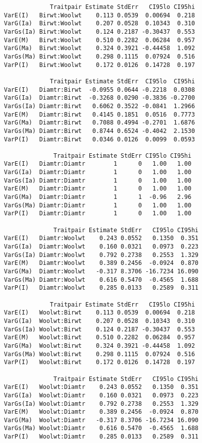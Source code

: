 \documentclass[titlepage]{article}  %
\begin{document}
\begin{verbatim}
             Traitpair Estimate StdErr   CI95lo CI95hi
VarE(I)   Birwt:Woolwt    0.113 0.0539  0.00694  0.218
VarG(Ia)  Birwt:Woolwt    0.207 0.0528  0.10343  0.310
VarGs(Ia) Birwt:Woolwt    0.124 0.2187 -0.30437  0.553
VarE(M)   Birwt:Woolwt    0.510 0.2282  0.06284  0.957
VarG(Ma)  Birwt:Woolwt    0.324 0.3921 -0.44458  1.092
VarGs(Ma) Birwt:Woolwt    0.298 0.1115  0.07924  0.516
VarP(I)   Birwt:Woolwt    0.172 0.0126  0.14728  0.197

             Traitpair Estimate StdErr  CI95lo  CI95hi
VarE(I)   Diamtr:Birwt  -0.0955 0.0644 -0.2218  0.0308
VarG(Ia)  Diamtr:Birwt  -0.3268 0.0290 -0.3836 -0.2700
VarGs(Ia) Diamtr:Birwt   0.6062 0.3522 -0.0841  1.2966
VarE(M)   Diamtr:Birwt   0.4145 0.1851  0.0516  0.7773
VarG(Ma)  Diamtr:Birwt   0.7088 0.4994 -0.2701  1.6876
VarGs(Ma) Diamtr:Birwt   0.8744 0.6524 -0.4042  2.1530
VarP(I)   Diamtr:Birwt   0.0346 0.0126  0.0099  0.0593

              Traitpair Estimate StdErr CI95lo CI95hi
VarE(I)   Diamtr:Diamtr        1      0   1.00   1.00
VarG(Ia)  Diamtr:Diamtr        1      0   1.00   1.00
VarGs(Ia) Diamtr:Diamtr        1      0   1.00   1.00
VarE(M)   Diamtr:Diamtr        1      0   1.00   1.00
VarG(Ma)  Diamtr:Diamtr        1      1  -0.96   2.96
VarGs(Ma) Diamtr:Diamtr        1      0   1.00   1.00
VarP(I)   Diamtr:Diamtr        1      0   1.00   1.00

              Traitpair Estimate StdErr   CI95lo CI95hi
VarE(I)   Diamtr:Woolwt    0.243 0.0552   0.1350  0.351
VarG(Ia)  Diamtr:Woolwt    0.160 0.0321   0.0973  0.223
VarGs(Ia) Diamtr:Woolwt    0.792 0.2738   0.2553  1.329
VarE(M)   Diamtr:Woolwt    0.389 0.2456  -0.0924  0.870
VarG(Ma)  Diamtr:Woolwt   -0.317 8.3706 -16.7234 16.090
VarGs(Ma) Diamtr:Woolwt    0.616 0.5470  -0.4565  1.688
VarP(I)   Diamtr:Woolwt    0.285 0.0133   0.2589  0.311

             Traitpair Estimate StdErr   CI95lo CI95hi
VarE(I)   Woolwt:Birwt    0.113 0.0539  0.00694  0.218
VarG(Ia)  Woolwt:Birwt    0.207 0.0528  0.10343  0.310
VarGs(Ia) Woolwt:Birwt    0.124 0.2187 -0.30437  0.553
VarE(M)   Woolwt:Birwt    0.510 0.2282  0.06284  0.957
VarG(Ma)  Woolwt:Birwt    0.324 0.3921 -0.44458  1.092
VarGs(Ma) Woolwt:Birwt    0.298 0.1115  0.07924  0.516
VarP(I)   Woolwt:Birwt    0.172 0.0126  0.14728  0.197

              Traitpair Estimate StdErr   CI95lo CI95hi
VarE(I)   Woolwt:Diamtr    0.243 0.0552   0.1350  0.351
VarG(Ia)  Woolwt:Diamtr    0.160 0.0321   0.0973  0.223
VarGs(Ia) Woolwt:Diamtr    0.792 0.2738   0.2553  1.329
VarE(M)   Woolwt:Diamtr    0.389 0.2456  -0.0924  0.870
VarG(Ma)  Woolwt:Diamtr   -0.317 8.3706 -16.7234 16.090
VarGs(Ma) Woolwt:Diamtr    0.616 0.5470  -0.4565  1.688
VarP(I)   Woolwt:Diamtr    0.285 0.0133   0.2589  0.311


\end{verbatim}
\end{document}
